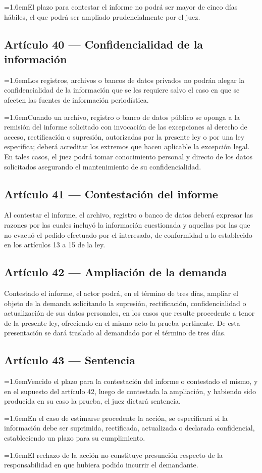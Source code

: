 \documentclass[10pt,a4paper]{article}
\newcommand{\articulo}[1]{\subsection{#1}}
\newcommand{\inciso}[2]{\par{\hangindent=1.6em\hangafter=1\makebox[1.6em][l]{#1}#2\par}}
\begin{document}
\inciso{2.}{El plazo para contestar el informe no podrá ser mayor de cinco días hábiles, el que podrá ser ampliado prudencialmente por el juez.}

\articulo{Artículo 40 --- Confidencialidad de la información}
\inciso{1.}{Los registros, archivos o bancos de datos privados no podrán alegar la confidencialidad de la información que se les requiere salvo el caso en que se afecten las fuentes de información periodística.}

\inciso{2.}{Cuando un archivo, registro o banco de datos público se oponga a la remisión del informe solicitado con invocación de las excepciones al derecho de acceso, rectificación o supresión, autorizadas por la presente ley o por una ley específica; deberá acreditar los extremos que hacen aplicable la excepción legal. En tales casos, el juez podrá tomar conocimiento personal y directo de los datos solicitados asegurando el mantenimiento de su confidencialidad.}

\articulo{Artículo 41 --- Contestación del informe}
Al contestar el informe, el archivo, registro o banco de datos deberá expresar las razones por las cuales incluyó la información cuestionada y aquellas por las que no evacuó el pedido efectuado por el interesado, de conformidad a lo establecido en los artículos 13 a 15 de la ley.

\articulo{Artículo 42 --- Ampliación de la demanda}
Contestado el informe, el actor podrá, en el término de tres días, ampliar el objeto de la demanda solicitando la supresión, rectificación, confidencialidad o actualización de sus datos personales, en los casos que resulte procedente a tenor de la presente ley, ofreciendo en el mismo acto la prueba pertinente. De esta presentación se dará traslado al demandado por el término de tres días.

\articulo{Artículo 43 --- Sentencia}
\inciso{1.}{Vencido el plazo para la contestación del informe o contestado el mismo, y en el supuesto del artículo 42, luego de contestada la ampliación, y habiendo sido producida en su caso la prueba, el juez dictará sentencia.}

\inciso{2.}{En el caso de estimarse procedente la acción, se especificará si la información debe ser suprimida, rectificada, actualizada o declarada confidencial, estableciendo un plazo para su cumplimiento.}

\inciso{3.}{El rechazo de la acción no constituye presunción respecto de la responsabilidad en que hubiera podido incurrir el demandante.}
\end{document}
